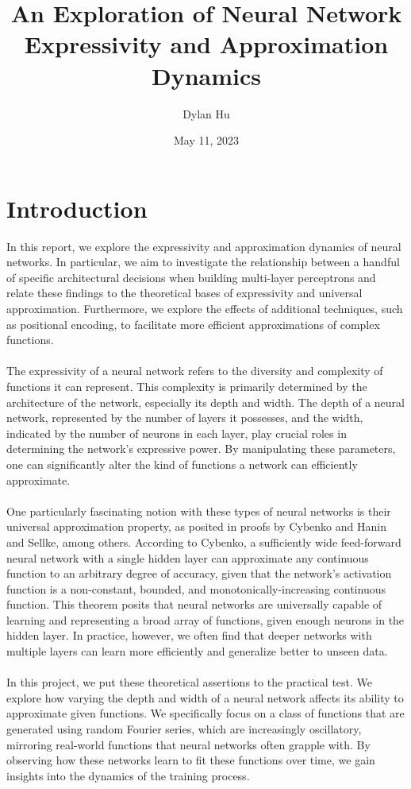\documentclass[11pt]{article}
\title{An Exploration of Neural Network Expressivity and Approximation Dynamics}
\author{Dylan Hu}
\date{May 11, 2023}
\begin{document}
\maketitle
{
  \hypersetup{linkcolor=black}
  \tableofcontents
}
\section{Introduction}
In this report, we explore the expressivity and approximation dynamics of neural networks. In particular, we aim to investigate the relationship between a handful of specific architectural decisions when building multi-layer perceptrons and relate these findings to the theoretical bases of expressivity and universal approximation. Furthermore, we explore the effects of additional techniques, such as positional encoding, to facilitate more efficient approximations of complex functions.
\\\\
The expressivity of a neural network refers to the diversity and complexity of functions it can represent. This complexity is primarily determined by the architecture of the network, especially its depth and width. The depth of a neural network, represented by the number of layers it possesses, and the width, indicated by the number of neurons in each layer, play crucial roles in determining the network's expressive power. By manipulating these parameters, one can significantly alter the kind of functions a network can efficiently approximate.
\\\\
One particularly fascinating notion with these types of neural networks is their universal approximation property, as posited in proofs by Cybenko and Hanin and Sellke, among others. According to Cybenko, a sufficiently wide feed-forward neural network with a single hidden layer can approximate any continuous function to an arbitrary degree of accuracy, given that the network's activation function is a non-constant, bounded, and monotonically-increasing continuous function. This theorem posits that neural networks are universally capable of learning and representing a broad array of functions, given enough neurons in the hidden layer. In practice, however, we often find that deeper networks with multiple layers can learn more efficiently and generalize better to unseen data.
\\\\
In this project, we put these theoretical assertions to the practical test. We explore how varying the depth and width of a neural network affects its ability to approximate given functions. We specifically focus on a class of functions that are generated using random Fourier series, which are increasingly oscillatory, mirroring real-world functions that neural networks often grapple with. By observing how these networks learn to fit these functions over time, we gain insights into the dynamics of the training process.
\end{document}
